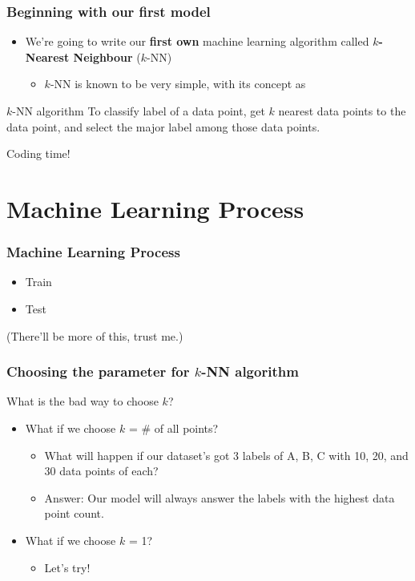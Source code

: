 \documentclass[aspectratio=169]{beamer}
\begin{document}
\begin{frame}
    \frametitle{Beginning with our first model}
    \begin{itemize}
        \item<2-> We're going to write our \textbf{first own} machine learning algorithm called \textbf{$k$-Nearest Neighbour} ($k$-NN)
        \begin{itemize}
            \item<3-> $k$-NN is known to be very simple, with its concept as
        \end{itemize}
    \end{itemize}
    \begin{block}{$k$-NN algorithm}
        To classify label of a data point, get $k$ nearest data points to the data point, and select the major label among those data points.
    \end{block}
\end{frame}

\begin{frame}
	\Huge{Coding time!}
\end{frame}

\section{Machine Learning Process}

\begin{frame}
	\frametitle{Machine Learning Process}
	\begin{itemize}
		\item Train
		\item Test
	\end{itemize}
	(There'll be more of this, trust me.)
\end{frame}

\begin{frame}
	\frametitle{Choosing the parameter for $k$-NN algorithm}
	What is the bad way to choose $k$?
	\begin{itemize}
		\item What if we choose $k$ = \# of all points?
		\begin{itemize}
			\item What will happen if our dataset's got 3 labels of A, B, C with 10, 20, and 30 data points of each?
			\item Answer: Our model will always answer the labels with the highest data point count.
		\end{itemize}
		\item What if we choose $k$ = 1?
		\begin{itemize}
			\item Let's try!
		\end{itemize}
	\end{itemize}
\end{frame}
\end{document}
